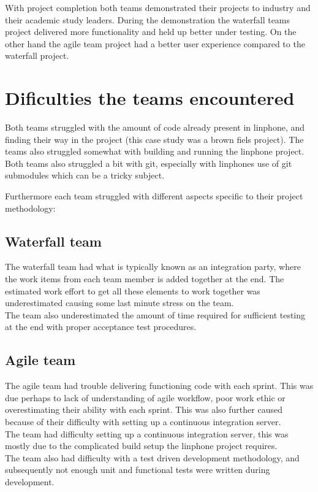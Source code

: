 \documentclass{sig-alternate-05-2015}
\begin{document}
With project completion both teams demonstrated their projects to industry and their academic study leaders. During the demonstration the waterfall teams project delivered more functionality and held up better under testing. On the other hand the agile team project had a better user experience compared to the waterfall project. 

\section{Dificulties the teams encountered} 

Both teams struggled with the amount of code already present in linphone, and finding their way in the project (this case study was a brown fiels project). The teams also struggled somewhat with building and running the linphone project. Both teams also struggled a bit with git, especially with linphones use of git submodules which can be a tricky subject.

Furthermore each team struggled with different aspects specific to their project methodology:

\subsection{Waterfall team}
The waterfall team had what is typically known as an integration party, where the work items from each team member is added together at the end. The estimated work effort to get all these elements to work together was underestimated causing some last minute stress on the team.
\\ 
The team also underestimated the amount of time required for sufficient testing at the end with proper acceptance test procedures.

\subsection{Agile team}
The agile team had trouble delivering functioning code with each sprint. This was due perhaps to lack of understanding of agile workflow, poor work ethic or overestimating their ability with each sprint. This was also further caused because of their difficulty with setting up a continuous integration server.
\\
The team had difficulty setting up a continuous integration server, this was mostly due to the complicated build setup the linphone project requires.
\\ 
The team also had difficulty with a test driven development methodology, and subsequently not enough unit and functional tests were written during development.
\end{document}
